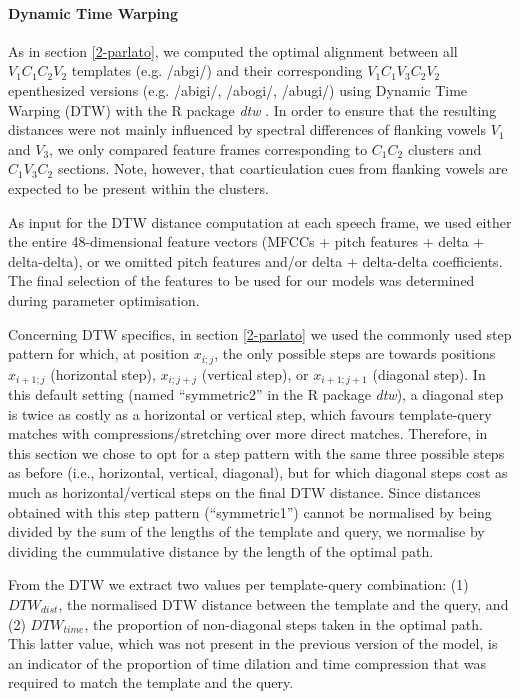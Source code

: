 \paragraph{Dynamic Time Warping}

As in section \ref{2-parlato}, we computed the optimal alignment between all $V_{1}C_{1}C_{2}V_{2}$ templates (e.g. /abgi/) and their corresponding $V_{1}C_{1}V_{3}C_{2}V_{2}$ epenthesized versions (e.g. /abigi/, /abogi/, /abugi/) using Dynamic Time Warping (DTW) \cite{sakoe1978} with the R package \textit{dtw} \cite{R-dtw}. In order to ensure that the resulting distances were not mainly influenced by spectral differences of flanking vowels $V_{1}$ and $V_{3}$, we only compared feature frames corresponding to $C_{1}C_{2}$ clusters and $C_{1}V_{3}C_{2}$ sections. Note, however, that coarticulation cues from flanking vowels are expected to be present within the clusters.

As input for the DTW distance computation at each speech frame, we used either the entire 48-dimensional feature vectors (MFCCs + pitch features + delta + delta-delta), or we omitted pitch features and/or delta + delta-delta coefficients. The final selection of the features to be used for our models was determined during parameter optimisation. 

Concerning DTW specifics, in section \ref{2-parlato} we used the commonly used step pattern for which, at position $x_{i;j}$, the only possible steps are towards positions $x_{i+1;j}$ (horizontal step), $x_{i;j+j}$ (vertical step), or $x_{i+1;j+1}$ (diagonal step). In this default setting (named ``symmetric2'' in the R package \textit{dtw}), a diagonal step is twice as costly as a horizontal or vertical step, which favours template-query matches with compressions/stretching over more direct matches. Therefore, in this section we chose to opt for a step pattern with the same three possible steps as before (i.e., horizontal, vertical, diagonal), but for which diagonal steps cost as much as horizontal/vertical steps on the final DTW distance. Since distances obtained with this step pattern (``symmetric1'') cannot be normalised by being divided by the sum of the lengths of the template and query, we normalise by dividing the cummulative distance by the length of the optimal path.

From the DTW we extract two values per template-query combination: (1) $DTW_{dist}$, the normalised DTW distance between the template and the query, and (2) $DTW_{time}$, the proportion of non-diagonal steps taken in the optimal path. This latter value, which was not present in the previous version of the model, is an indicator of the proportion of time dilation and time compression that was required to match the template and the query.     

